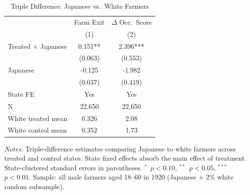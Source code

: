 \begin{table}[htbp]
\centering
\caption{Triple Difference: Japanese vs.\ White Farmers}
\label{tab:ddd}
\begin{tabular}{lcc}
\hline\hline
 & Farm Exit & $\Delta$ Occ.\ Score \\
 & (1) & (2) \\
\hline
Treated $\times$ Japanese & 0.151** & 2.396*** \\
 & (0.063) & (0.553) \\
\addlinespace
Japanese & -0.125 & -1.982 \\
 & (0.037) & (0.419) \\
\addlinespace
State FE & Yes & Yes \\
N & 22,650 & 22,650 \\
White treated mean & 0.326 & 2.08 \\
White control mean & 0.352 & 1.73 \\
\hline\hline
\end{tabular}
\begin{tablenotes}
\item \textit{Notes:} Triple-difference estimates comparing Japanese to white farmers across treated and control states. State fixed effects absorb the main effect of treatment. State-clustered standard errors in parentheses. $^{*}$~$p<0.10$, $^{**}$~$p<0.05$, $^{***}$~$p<0.01$. Sample: all male farmers aged 18--60 in 1920 (Japanese + 2\% white random subsample).
\end{tablenotes}
\end{table}
